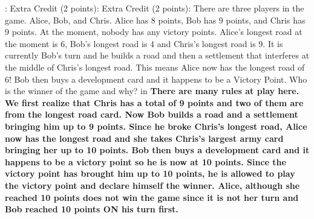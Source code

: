 \documentclass[11.5pt]{article}
\begin{document}
\vskip 0.16in

: Extra Credit (2 points): Extra Credit (2 points): There are three players in the game. Alice, Bob, and Chris. Alice has 8 points, Bob has 9 points, and Chris has 9 points. At the moment, nobody has any victory points. Alice's longest road at the moment is 6, Bob's longest road is 4 and Chris's longest road is 9. It is currently Bob's turn and he builds a road and then a settlement that interferes at the middle of Chris's longest road. This means Alice now has the longest road of 6! Bob then buys a development card and it happens to be a Victory Point. Who is the winner of the game and why?
 in
\indent \textbf{There are many rules at play here. We first realize that Chris has a total of 9 points and two of them are from the longest road card. Now Bob builds a road and a settlement bringing him up to 9 points. Since he broke Chris's longest road, Alice now has the longest road and she takes Chris's largest army card bringing her up to 10 points. Bob then buys a development card and it happens to be a victory point so he is now at 10 points. Since the victory point has brought him up to 10 points, he is allowed to play the victory point and declare himself the winner. Alice, although she reached 10 points does not win the game since it is not her turn and Bob reached 10 points ON his turn first.}
\end{document}
